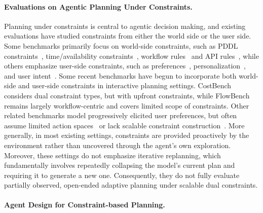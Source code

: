 \paragraph{Evaluations on Agentic Planning Under Constraints.}
Planning under constraints is central to agentic decision making, and existing evaluations have studied constraints from either the world side or the user side.
Some benchmarks primarily focus on world-side constraints, such as PDDL constraints~\citep{PlanBench}, time/availability constraints~\citep{NATURAL-PLAN}, workflow rules~\citep{FlowBench} and API rules~\cite{appworld}, while others emphasize user-side constraints, such as preferences~\citep{PrefEval,RealPref}, personalization~\citep{PersonaMem-v1,PersonaMem-v2}, and user intent~\citep{UserBench,wang-etal-2024-user}. 
Some recent benchmarks have begun to incorporate both world-side and user-side constraints in interactive planning settings. 
CostBench~\citep{costbench} considers dual constraint types, but with upfront constraints, while FlowBench~\citep{FlowBench} remains largely workflow-centric and covers limited scope of constraints. 
Other related benchmarks model progressively elicited user preferences, but often assume limited action spaces~\citep{TravelPlanner,luo2025ultrahorizon} or lack scalable constraint construction~\citep{tau-bench}. 
More generally, in most existing settings, constraints are provided proactively by the environment rather than uncovered through the agent’s own exploration. 
Moreover, these settings do not emphasize iterative replanning, which fundamentally involves repeatedly collapsing the model’s current plan and requiring it to generate a new one. 
Consequently, they do not fully evaluate partially observed, open-ended adaptive planning under scalable dual constraints.

\paragraph{Agent Design for Constraint-based Planning.}

